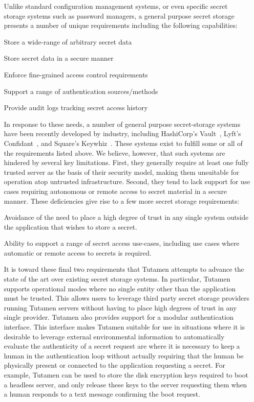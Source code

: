 Unlike standard configuration management systems, or even specific
secret storage systems such as password managers, a general purpose
secret storage presents a number of unique requirements including the
following capabilities:

\begin{packed_item}
\item Store a wide-range of arbitrary secret data
\item Store secret data in a secure manner
\item Enforce fine-grained access control requirements
\item Support a range of authentication sources/methods
\item Provide audit logs tracking secret access history
\end{packed_item}

In response to these needs, a number of general purpose secret-storage
systems have been recently developed by industry, including
HashiCorp's Vault~\cite{vault}, Lyft's Confidant~\cite{confidant}, and
Square's Keywhiz~\cite{keywhiz}. These systems exist to fulfill some
or all of the requirements listed above. We believe, however, that
such systems are hindered by several key limitations. First, they
generally require at least one fully trusted server as the basis of
their security model, making them unsuitable for operation atop
untrusted infrastructure. Second, they tend to lack support for use
cases requiring autonomous or remote access to secret material in a
secure manner. These deficiencies give rise to a few more secret
storage requirements:

\begin{packed_item}
\item Avoidance of the need to place a high degree of trust in any
  single system outside the application that wishes to store a secret.
\item Ability to support a range of secret access use-cases, including
  use cases where automatic or remote access to secrets is required.
\end{packed_item}

It is toward these final two requirements that Tutamen attempts to
advance the state of the art over existing secret storage systems. In
particular, Tutamen supports operational modes where no single entity
other than the application must be trusted. This allows users to
leverage third party secret storage providers running Tutamen servers
without having to place high degrees of trust in any single
provider. Tutamen also provides support for a modular authentication
interface. This interface makes Tutamen suitable for use in situations
where it is desirable to leverage external environmental information
to automatically evaluate the authenticity of a secret request are
where it is necessary to keep a human in the authentication loop
without actually requiring that the human be physically present or
connected to the application requesting a secret. For example, Tutamen
can be used to store the disk encryption keys required to boot a
headless server, and only release these keys to the server requesting
them when a human responds to a text message confirming the boot
request.

